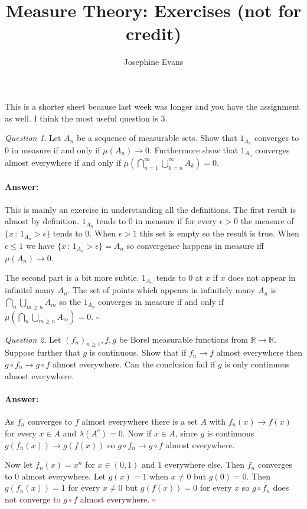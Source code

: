 \documentclass[11pt]{article}
\author{
Josephine Evans
}
\title{Measure Theory: Exercises (not for credit)}
\theoremstyle{definition}
\theoremstyle{remark}
\newtheorem{q}{Question}
\newenvironment{ans}{\paragraph{Answer:}}{\hfill$\square$ \vspace{10pt}}
\begin{document}
\maketitle
This is a shorter sheet because last week was longer and you have the assignment as well. I think the most useful question is 3.

\begin{q}
Let $A_n$ be a sequence of measurable sets. Show that $1_{A_n}$ converges to $0$ in measure if and only if $\mu(A_n) \rightarrow 0$. Furthermore show that $1_{A_n}$ converges almost everywhere if and only if $\mu(\bigcap_{n=1}^\infty \bigcup_{k=n}^\infty A_k) = 0$.
\end{q}
\begin{ans}
This is mainly an exercise in understanding all the definitions. The first result is almost by definition. $1_{A_n}$ tends to $0$ in measure if for every $\epsilon>0$ the measure of $\{x \,:\, 1_{A_n} > \epsilon\}$ tends to $0$. When $\epsilon >1$ this set is empty so the result is true. When $\epsilon \leq 1$ we have $\{x \,:\, 1_{A_n} > \epsilon\} = A_n$ so convergence happens in measure iff $\mu(A_n) \rightarrow 0$.

The second part is a bit more subtle. $1_{A_n}$ tends to $0$ at $x$ if $x$ does not appear in infinitel many $A_n$. The set of points which appears in infinitely many $A_n$ is $\bigcap_n \bigcup_{m \geq n} A_m$ so the $1_{A_n}$ converges in measure if and only if $\mu(\bigcap_n \bigcup_{m \geq n} A_m) = 0$.
\end{ans}

\begin{q}
Let $(f_n)_{n \geq 1}, f, g$ be Borel measurable functions from $\mathbb{R} \rightarrow \mathbb{R}$. Suppose further that $g$ is continuous. Show that if $f_n \rightarrow f$ almost everywhere then $g\circ f_n \rightarrow g \circ f$ almost everywhere. Can the conclusion fail if $g$ is only continuous almost everywhere. 
\end{q}
\begin{ans}
As $f_n$ converges to $f$ almost everywhere there is a set $A$ with $f_n(x) \rightarrow f(x)$ for every $x \in A$ and $\lambda(A^c) = 0$. Now if $x \in A$, since $g$ is continuous $g(f_n(x)) \rightarrow g(f(x))$ so $g \circ f_n \rightarrow g \circ f$ almost everywhere. 

Now let $f_n(x) = x^n$ for $x \in (0,1)$ and $1$ everywhere else. Then $f_n$ converges to $0$ almost everywhere. Let $g(x) = 1$ when $x \neq 0$ but $g(0) = 0$. Then $g(f_n(x)) = 1$ for every $x \neq 0$ but $g(f(x))=0$ for every $x$ so $g \circ f_n$ does not converge to $g \circ f$ almost everywhere.
\end{ans}
\end{document}
